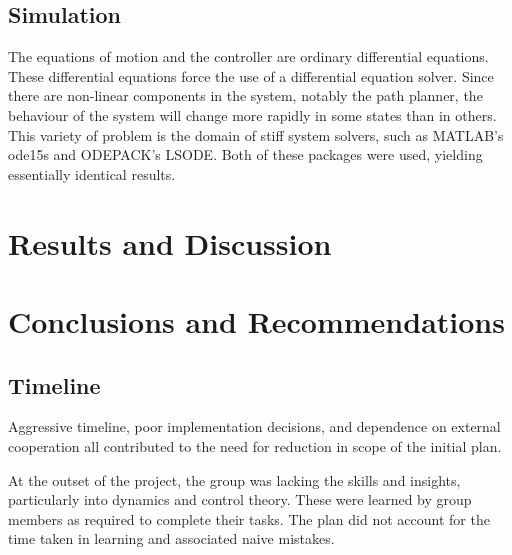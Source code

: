 \documentclass{sydeStyle}
\begin{document}
\section{Simulation}

The equations of motion and the controller are ordinary differential equations.
These differential equations force the use of a differential equation solver.
Since there are non-linear components in the system, notably the path planner,
the behaviour of the system will change more rapidly in some states than in others.
This variety of problem is the domain of stiff system solvers, such as MATLAB's
ode15s and ODEPACK's LSODE. Both of these packages were used, yielding essentially
identical results.

\chapter{Results and Discussion}

\chapter{Conclusions and Recommendations}

\appendix

\section{Timeline}


Aggressive timeline, poor implementation decisions, and dependence on external
cooperation all contributed to the need for reduction in scope of the initial
plan.

At the outset of the project, the group was lacking the skills and insights,
particularly into dynamics and control theory. These were learned by group
members as required to complete their tasks. The plan did not account for the
time taken in learning and associated naive mistakes.
\end{document}

